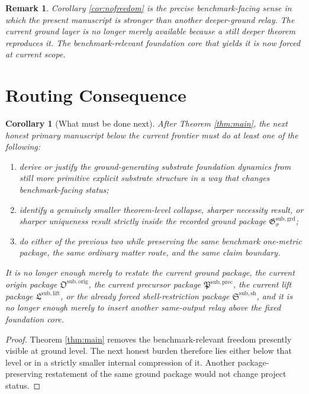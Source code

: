 \documentclass[11pt]{article}
\newcommand{\OriginPackage}{\mathfrak O^{\mathrm{sub,orig}}}
\newcommand{\GroundPackage}{\mathfrak G^{\mathrm{sub,grd}}}
\newcommand{\PrecursorPackage}{\mathfrak P^{\mathrm{sub,prec}}}
\newcommand{\LiftPackage}{\mathfrak L^{\mathrm{sub,lift}}}
\newcommand{\ShellRestriction}{\mathfrak S^{\mathrm{sub,sh}}}
\newtheorem{remark}{Remark}
\newtheorem{corollary}{Corollary}
\begin{document}
\begin{remark}
Corollary \ref{cor:nofreedom} is the precise benchmark-facing sense in which the present manuscript is stronger than another deeper-ground relay. The current ground layer is no longer merely available because a still deeper theorem reproduces it. The benchmark-relevant foundation core that yields it is now forced at current scope.
\end{remark}

\section{Routing Consequence}

\begin{corollary}[What must be done next]
\label{cor:next}
After Theorem \ref{thm:main}, the next honest primary manuscript below the current frontier must do at least one of the following:
\begin{enumerate}
    \item derive or justify the ground-generating substrate foundation dynamics from still more primitive explicit substrate structure in a way that changes benchmark-facing status;
    \item identify a genuinely smaller theorem-level collapse, sharper necessity result, or sharper uniqueness result strictly inside the recorded ground package \(\GroundPackage_{\sigma}\);
    \item do either of the previous two while preserving the same benchmark one-metric package, the same ordinary matter route, and the same claim boundary.
\end{enumerate}
It is no longer enough merely to restate the current ground package, the current origin package \(\OriginPackage\), the current precursor package \(\PrecursorPackage\), the current lift package \(\LiftPackage\), or the already forced shell-restriction package \(\ShellRestriction\), and it is no longer enough merely to insert another same-output relay above the fixed foundation core.
\end{corollary}

\begin{proof}
Theorem \ref{thm:main} removes the benchmark-relevant freedom presently visible at ground level. The next honest burden therefore lies either below that level or in a strictly smaller internal compression of it. Another package-preserving restatement of the same ground package would not change project status.
\end{proof}
\end{document}

